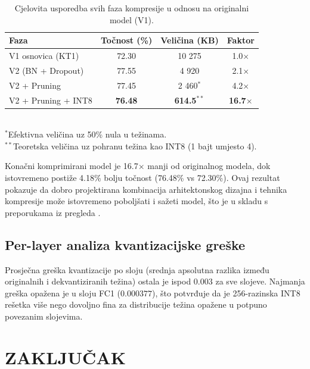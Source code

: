 \documentclass[letterpaper, 10 pt, conference]{ieeeconf}
\begin{document}
\begin{table}[h]
\caption{Cjelovita usporedba svih faza kompresije u odnosu na originalni model (V1).}
\label{tab:full_pipeline}
\begin{center}
\footnotesize
\begin{tabular}{lccc}
\toprule
\textbf{Faza} & \textbf{Točnost (\%)} & \textbf{Veličina (KB)} & \textbf{Faktor} \\
\midrule
V1 osnovica (KT1)            & 72.30 & 10 275 & 1.0$\times$ \\
V2 (BN + Dropout)            & 77.55 & 4 920  & 2.1$\times$ \\
V2 + Pruning                 & 77.45 & 2 460$^{*}$ & 4.2$\times$ \\
V2 + Pruning + INT8          & \textbf{76.48} & \textbf{614.5}$^{**}$ & \textbf{16.7$\times$} \\
\bottomrule
\end{tabular}
\\[2pt]
{\scriptsize $^{*}$Efektivna veličina uz 50\% nula u težinama.}\\
{\scriptsize $^{**}$Teoretska veličina uz pohranu težina kao INT8 (1 bajt umjesto 4).}
\end{center}
\end{table}

Konačni komprimirani model je 16.7$\times$ manji od originalnog modela, dok istovremeno postiže 4.18\% bolju točnost (76.48\% vs 72.30\%).
Ovaj rezultat pokazuje da dobro projektirana kombinacija arhitektonskog dizajna i tehnika kompresije može istovremeno poboljšati i sažeti model, što je u skladu s preporukama iz pregleda \cite{li2023survey}.

\subsection{Per-layer analiza kvantizacijske greške}

Prosječna greška kvantizacije po sloju (srednja apsolutna razlika između originalnih i dekvantiziranih težina) ostala je ispod $0.003$ za sve slojeve.
Najmanja greška opažena je u sloju FC1 ($0.000377$), što potvrđuje da je 256-razinska INT8 rešetka više nego dovoljno fina za distribucije težina opažene u potpuno povezanim slojevima.

\section{\textbf{ZAKLJUČAK}}
\end{document}
